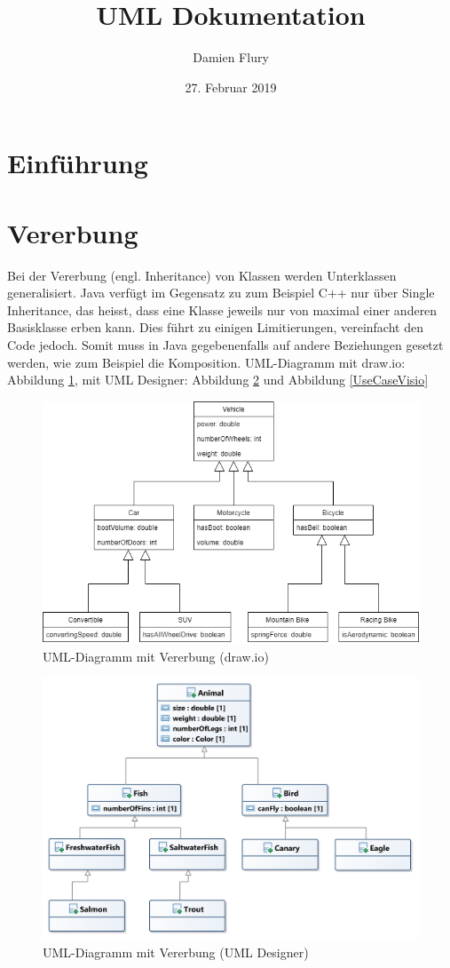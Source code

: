 \documentclass[a4paper, titlepage]{scrartcl}
\title{UML Dokumentation}
\author{Damien Flury}
\date{27. Februar 2019}
\begin{document}
    \maketitle
    \tableofcontents
    \newpage
    \section{Einführung}
    \section{Vererbung}
    Bei der Vererbung (engl. Inheritance) von Klassen werden Unterklassen generalisiert. Java
    verfügt im Gegensatz zu zum Beispiel C++ nur über Single Inheritance, das heisst, dass eine Klasse
    jeweils nur von maximal einer anderen Basisklasse erben kann. Dies führt zu einigen Limitierungen,
    vereinfacht den Code jedoch. Somit muss in Java gegebenenfalls auf andere Beziehungen gesetzt werden,
    wie zum Beispiel die Komposition. UML-Diagramm mit draw.io: Abbildung \ref{VererbungDrawIO}, 
    mit UML Designer: Abbildung \ref{VererbungUmlDesigner}  und Abbildung \ref{UseCaseVisio}
    \begin{figure}
        \includegraphics[width=\textwidth]{Klassendiagramm1a}
        \caption{UML-Diagramm mit Vererbung (draw.io)}
        \label{VererbungDrawIO}
    \end{figure}
    \begin{figure}
        \includegraphics[width=\textwidth]{Klassendiagramm1b}
        \caption{UML-Diagramm mit Vererbung (UML Designer)}
        \label{VererbungUmlDesigner}
    \end{figure}
\end{document}

